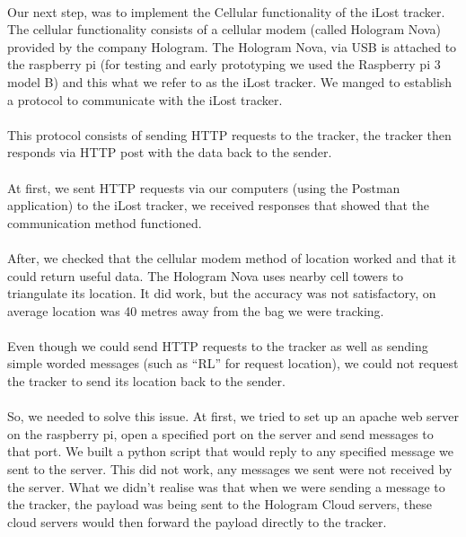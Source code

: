 \documentclass[12pt,a4paper]{article}
\begin{document}
        
        \paragraph{} Our next step, was to implement the Cellular functionality of the iLost tracker. The cellular functionality consists of a cellular modem (called Hologram Nova) provided by the company Hologram. The Hologram Nova, via USB is attached to the raspberry pi (for testing and early prototyping we used the Raspberry pi 3 model B) and this what we refer to as the iLost tracker. We manged to establish a protocol to communicate with the iLost tracker.
        
        \paragraph{} This protocol consists of sending HTTP requests to the tracker, the tracker then responds via HTTP post with the data back to the sender.   
        
        \paragraph{} At first, we sent HTTP requests via our computers (using the Postman application) to the iLost tracker, we received responses that showed that the communication method functioned. 
        
        \paragraph{} After, we checked that the cellular modem method of location worked and that it could return useful data. The Hologram Nova uses nearby cell towers to triangulate its location. It did work, but the accuracy was not satisfactory, on average location was 40 metres away from the bag we were tracking.
        
        \paragraph{} Even though we could send HTTP requests to the tracker as well as sending simple worded messages (such as “RL” for request location), we could not request the tracker to send its location back to the sender.
        
        \paragraph{} So, we needed to solve this issue. At first, we tried to set up an apache web server on the raspberry pi, open a specified port on the server and send messages to that port. We built a python script that would reply to any specified message we sent to the server. This did not work, any messages we sent were not received by the server. What we didn’t realise was that when we were sending a message to the tracker, the payload was being sent to the Hologram Cloud servers, these cloud servers would then forward the payload directly to the tracker.
        
\end{document}
